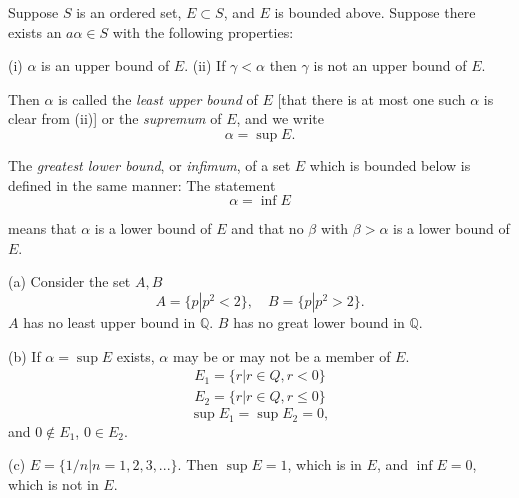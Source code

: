\begin{myDef}\label{myDef:1.8}
Suppose $S$ is an ordered set, $E \subset S$, and $E$ is bounded above.
Suppose there exists an $a\alpha \in S$ with the following properties:

(i) $\alpha$ is an upper bound of $E$.
(ii) If $\gamma <\alpha$ then $\gamma$ is not an upper bound of $E$.

Then $\alpha$ is called the \emph{least upper bound} of $E$ [that there is at most one such
$\alpha$ is clear from (ii)] or the \emph{supremum} of $E$, and we write
\begin{equation*}
    \alpha = \sup E.
\end{equation*}

The \emph{greatest lower bound}, or \emph{infimum}, of a set $E$ which is bounded below
is defined in the same manner: The statement
\begin{equation*}
    \alpha = \inf E
\end{equation*}

means that $\alpha$ is a lower bound of $E$ and that no $\beta$ with $\beta > \alpha$ is a lower bound
of $E$.
\end{myDef}

\begin{myExample}\label{Example:1.9}
(a) Consider the set $A, B$
    \begin{equation*}
        A = \{p|p^2 < 2\},\quad
        B = \{p|p^2 > 2\}.
    \end{equation*}
    $A$ has no least upper bound in $\mathbb{Q}$.
    $B$ has no great lower bound in $\mathbb{Q}$.
    
    (b) If $\alpha = \sup E$ exists, $\alpha$ may be or may not be a member of $E$.
    \begin{align*}
        E_1 = \{r |r\in Q, r < 0\}\\
        E_2 = \{r |r\in Q, r \leq 0\}
    \end{align*}
    \begin{equation*}
        \sup E_1 = \sup E_2 = 0,
    \end{equation*}
    and $0\not\in E_1$, $0\in E_2$.
    
    (c) $E = \{1/n | n = 1,2,3,...\}$. Then $\sup E = 1$, which is in $E$, and $\inf E = 0$, which is not in $E$.
\end{myExample}

